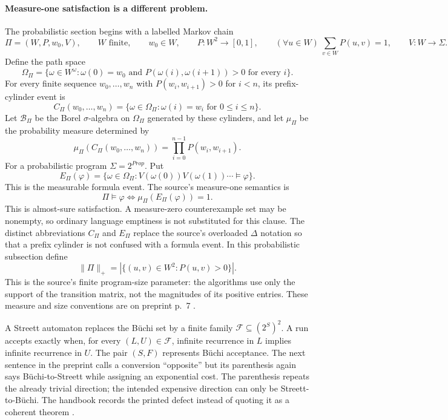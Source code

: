 \paragraph{Measure-one satisfaction is a different problem.}
The probabilistic section begins with a labelled Markov chain
\[
 \Pi=(W,P,w_0,V),
 \qquad
 W\text{ finite},
 \qquad
 w_0\in W,
 \qquad
 P:W^2\to[0,1],
 \qquad
 (\forall u\in W)\ \sum_{v\in W}P(u,v)=1,
 \qquad
 V:W\to\Sigma.
\]
Define the path space
\[
 \Omega_\Pi=
 \{\omega\in W^\omega:\omega(0)=w_0\text{ and }
 P(\omega(i),\omega(i+1))>0\text{ for every }i\}.
\]
For every finite sequence \(w_0,\ldots,w_n\) with
\(P(w_i,w_{i+1})>0\) for \(i<n\), its prefix-cylinder event is
\[
 C_\Pi(w_0,\ldots,w_n)
 =\{\omega\in\Omega_\Pi:\omega(i)=w_i\text{ for }0\le i\le n\}.
\]
Let \(\mathcal B_\Pi\) be the Borel \(\sigma\)-algebra on \(\Omega_\Pi\)
generated by these cylinders, and let \(\mu_\Pi\) be the probability measure
determined by
\[
 \mu_\Pi(C_\Pi(w_0,\ldots,w_n))
 =\prod_{i=0}^{n-1}P(w_i,w_{i+1}).
\]
For a probabilistic program \(\Sigma=2^{\mathit{Prop}}\).  Put
\[
 E_\Pi(\varphi)
 =\{\omega\in\Omega_\Pi:
 V(\omega(0))V(\omega(1))\cdots\models\varphi\}.
\]
This is the measurable formula event.  The source's measure-one semantics is
\[
 \Pi\models\varphi
 \Longleftrightarrow
 \mu_\Pi(E_\Pi(\varphi))=1.
\]
This is almost-sure satisfaction.  A measure-zero counterexample set may be
nonempty, so ordinary language emptiness is not substituted for this clause.
The distinct abbreviations \(C_\Pi\) and \(E_\Pi\) replace the source's
overloaded \(\Delta\) notation so that a prefix cylinder is not confused with
a formula event.  In this probabilistic subsection define
\[
 \lVert\Pi\rVert_+
 =|\{(u,v)\in W^2:P(u,v)>0\}|.
\]
This is the source's finite program-size parameter: the algorithms use only
the support of the transition matrix, not the magnitudes of its positive
entries.
These measure and size conventions are on preprint p.~7
\cite[preprint p.~7]{VardiWolper1986}.

A Streett automaton replaces the B\"uchi set by a finite family
\(\mathcal F\subseteq(2^S)^2\).  A run accepts exactly when, for every
\((L,U)\in\mathcal F\), infinite recurrence in \(L\) implies infinite
recurrence in \(U\).  The pair \((S,F)\) represents B\"uchi acceptance.  The
next sentence in the preprint calls a conversion ``opposite'' but its
parenthesis again says B\"uchi-to-Streett while assigning an exponential
cost.  The parenthesis repeats the already trivial direction; the intended
expensive direction can only be Streett-to-B\"uchi.  The handbook records the
printed defect instead of quoting it as a coherent theorem
\cite[preprint p.~8]{VardiWolper1986}.

